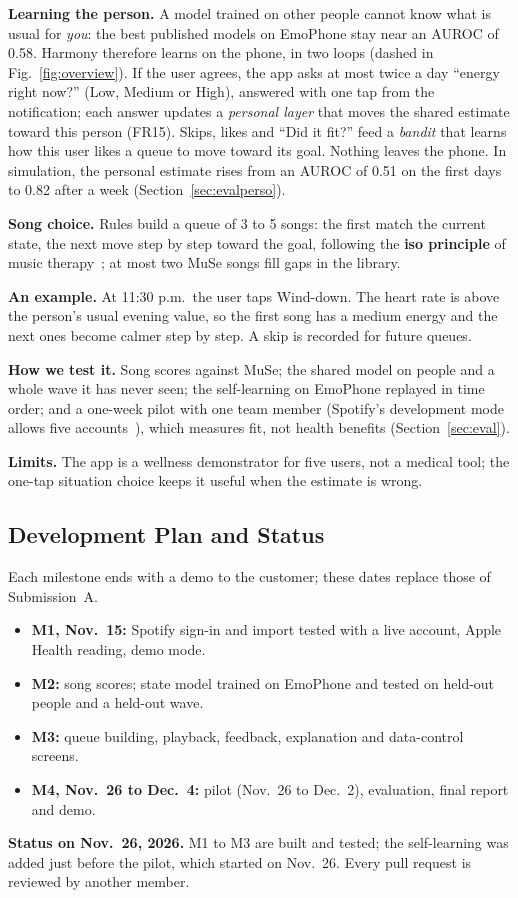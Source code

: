 \documentclass[conference]{IEEEtran}
\begin{document}
\textbf{Learning the person.} A model trained on other people cannot know what is usual for \emph{you}: the best published models on EmoPhone stay near an AUROC of 0.58. Harmony therefore learns on the phone, in two loops (dashed in Fig.~\ref{fig:overview}). If the user agrees, the app asks at most twice a day ``energy right now?'' (Low, Medium or High), answered with one tap from the notification; each answer updates a \emph{personal layer} that moves the shared estimate toward this person (FR15). Skips, likes and ``Did it fit?'' feed a \emph{bandit} that learns how this user likes a queue to move toward its goal. Nothing leaves the phone. In simulation, the personal estimate rises from an AUROC of 0.51 on the first days to 0.82 after a week (Section~\ref{sec:evalperso}).

\textbf{Song choice.} Rules build a queue of 3 to 5 songs: the first match the current state, the next move step by step toward the goal, following the \textbf{iso principle} of music therapy~\cite{iso}; at most two MuSe songs fill gaps in the library.

\textbf{An example.} At 11:30 p.m.\ the user taps Wind-down. The heart rate is above the person's usual evening value, so the first song has a medium energy and the next ones become calmer step by step. A skip is recorded for future queues.

\textbf{How we test it.} Song scores against MuSe; the shared model on people and a whole wave it has never seen; the self-learning on EmoPhone replayed in time order; and a one-week pilot with one team member (Spotify's development mode allows five accounts~\cite{spotify2026}), which measures fit, not health benefits (Section~\ref{sec:eval}).

\textbf{Limits.} The app is a wellness demonstrator for five users, not a medical tool; the one-tap situation choice keeps it useful when the estimate is wrong.

\subsection{Development Plan and Status}\label{sec:plan}
Each milestone ends with a demo to the customer; these dates replace those of Submission~A.
\begin{itemize}
\item \textbf{M1, Nov.\ 15:} Spotify sign-in and import tested with a live account, Apple Health reading, demo mode.
\item \textbf{M2:} song scores; state model trained on EmoPhone and tested on held-out people and a held-out wave.
\item \textbf{M3:} queue building, playback, feedback, explanation and data-control screens.
\item \textbf{M4, Nov.\ 26 to Dec.\ 4:} pilot (Nov.\ 26 to Dec.\ 2), evaluation, final report and demo.
\end{itemize}
\textbf{Status on Nov.\ 26, 2026.} M1 to M3 are built and tested; the self-learning was added just before the pilot, which started on Nov.\ 26. Every pull request is reviewed by another member.
\end{document}
